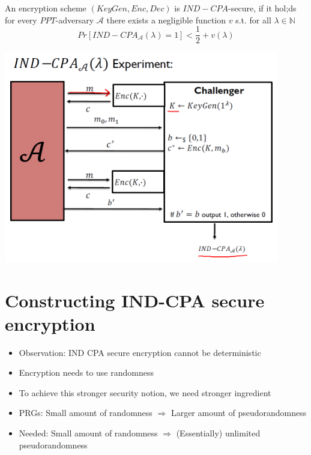 \newpage
	\begin{definition}
	    An encryption scheme $(KeyGen,Enc,Dec)$ is $IND-CPA$-secure, if it hol;ds for every $PPT$-adversary $\mathcal{A}$ there exists a negligible function $v$ s.t. 
	    for all $\lambda \in \mathbb{N}$
	    $$Pr[IND-CPA_{\mathcal{A}}(\lambda)=1] < \frac{1}{2} + v(\lambda)$$
	    \begin{center}
			\includegraphics[width=120mm]{Graphics/CPA/cpa2.png}
		\end{center}
	\end{definition}
	
	
	
\section{Constructing IND-CPA secure encryption}
	\begin{itemize}
	    \item Observation: IND CPA secure encryption cannot be deterministic
	    \item Encryption needs to use randomness
	    \item To achieve this stronger security notion, we need stronger ingredient
	    \item PRGs: Small amount of randomness $\Rightarrow$ Larger amount of pseudorandomness
	    \item Needed: Small amount of randomness $\Rightarrow$ (Essentially) unlimited pseudorandomness
	\end{itemize}
	
